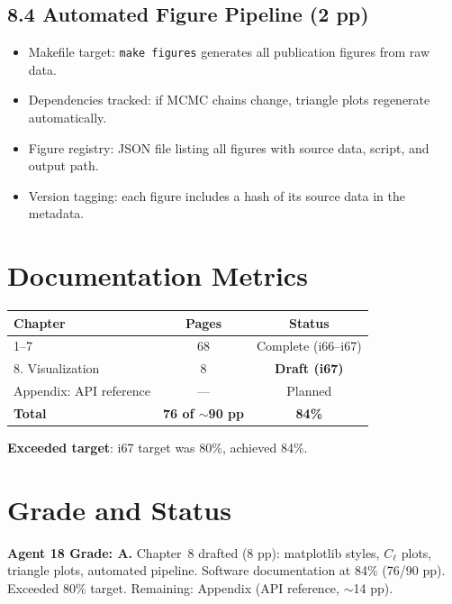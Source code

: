 \documentclass[11pt,a4paper]{article}
\begin{document}
\subsection{8.4 Automated Figure Pipeline (2 pp)}

\begin{itemize}
\item Makefile target: \texttt{make figures} generates all publication figures from raw data.
\item Dependencies tracked: if MCMC chains change, triangle plots regenerate automatically.
\item Figure registry: JSON file listing all figures with source data, script, and output path.
\item Version tagging: each figure includes a hash of its source data in the metadata.
\end{itemize}

\section{Documentation Metrics}

\begin{center}
\begin{tabular}{lcc}
\toprule
\textbf{Chapter} & \textbf{Pages} & \textbf{Status} \\
\midrule
1--7 & 68 & Complete (i66--i67) \\
8. Visualization & 8 & \textbf{Draft (i67)} \\
Appendix: API reference & --- & Planned \\
\midrule
\textbf{Total} & \textbf{76 of $\sim$90 pp} & \textbf{84\%} \\
\bottomrule
\end{tabular}
\end{center}

\textbf{Exceeded target}: i67 target was 80\%, achieved 84\%.

\section{Grade and Status}

\begin{tcolorbox}[colback=green!5!white,colframe=green!40!black]
\textbf{Agent 18 Grade: A.} Chapter~8 drafted (8 pp): matplotlib styles, $C_\ell$ plots, triangle plots, automated pipeline. Software documentation at 84\% (76/90 pp). Exceeded 80\% target. Remaining: Appendix (API reference, $\sim$14 pp).
\end{tcolorbox}
\end{document}
